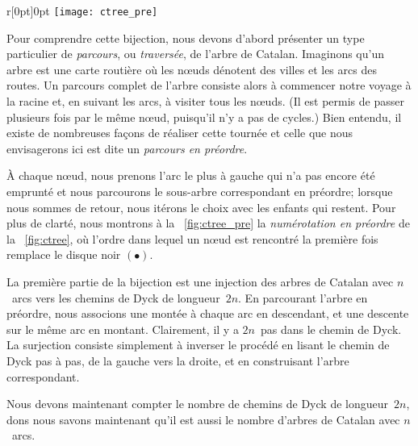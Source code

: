 \begin{wrapfigure}[7]{r}[0pt]{0pt}
\centering
\texttt{[image: ctree\_pre]}
\caption{}
\label{fig:ctree_pre}
\end{wrapfigure}
Pour comprendre cette bijection, nous devons d'abord présenter un type
particulier de \emph{parcours}, ou
\emph{traversée}, de l'arbre de
Catalan. Imaginons qu'un arbre est une carte routière où les n{\oe}uds
dénotent des villes et les arcs des routes. Un parcours complet de
l'arbre consiste alors à commencer notre voyage à la racine et, en
suivant les arcs, à visiter tous les n{\oe}uds. (Il est permis de
passer plusieurs fois par le même n{\oe}ud, puisqu'il n'y a pas de
cycles.) Bien entendu, il existe de nombreuses façons de réaliser
cette tournée et celle que nous envisagerons ici est dite un
\emph{parcours en préordre}.

À chaque n{\oe}ud, nous prenons l'arc le plus à gauche qui n'a pas
encore été emprunté et nous parcourons le sous-arbre correspondant en
préordre; lorsque nous sommes de retour, nous itérons le choix avec
les enfants qui restent. Pour plus de clarté, nous montrons à la
\fig~\ref{fig:ctree_pre} la \emph{numérotation en
  préordre} de
la \fig~\ref{fig:ctree}, où l'ordre dans lequel un n{\oe}ud est
rencontré la première fois remplace le disque noir \((\bullet)\).

La première partie de la bijection est une injection des arbres de
Catalan avec \(n\)~arcs vers les chemins de Dyck de
longueur~\(2n\). En parcourant l'arbre en préordre, nous associons une
montée à chaque arc en descendant, et une descente sur le même arc en
montant. Clairement, il y a \(2n\)~pas dans le chemin de Dyck. La
surjection consiste simplement à inverser le procédé en lisant le
chemin de Dyck pas à pas, de la gauche vers la droite, et en
construisant l'arbre correspondant.

Nous devons maintenant compter le nombre de chemins de Dyck de
longueur~\(2n\), dons nous savons maintenant qu'il est aussi le nombre
d'arbres de Catalan avec \(n\)~arcs.

